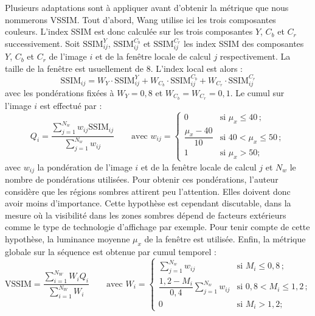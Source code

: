 Plusieurs adaptations sont à appliquer avant d'obtenir la métrique que nous nommerons VSSIM. Tout d'abord, Wang utilise ici les trois composantes couleurs. L'index SSIM est donc calculée sur les trois composantes $Y$, $C_b$ et $C_r$ successivement. Soit $\text{SSIM}_{\mathit{ij}}^Y$, $\text{SSIM}_{\mathit{ij}}^{C_b}$ et $\text{SSIM}_{\mathit{ij}}^{C_r}$ les index SSIM des composantes $Y$, $C_b$ et $C_r$ de l'image $i$ et de la fenêtre locale de calcul $j$ respectivement. La taille de la fenêtre est usuellement de 8. L'index local est alors :
\begin{equation}
\text{SSIM}_{\mathit{ij}} =W_Y \cdot \text{SSIM}_{\mathit{ij}}^Y + W_{C_b} \cdot \text{SSIM}_{\mathit{ij}}^{C_b} + W_{C_r} \cdot \text{SSIM}_{\mathit{ij}}^{C_r}
\end{equation}
%
avec les pondérations fixées à $W_Y=0,8$ et $W_{C_b}=W_{C_r}=0,1$. Le cumul sur l'image $i$ est effectué par :
\begin{equation}
Q_i = \dfrac{\sum\limits_{j=1}^{N_w} w_{\mathit{ij}} \text{SSIM}_{ij}}{\sum\limits_{j=1}^{N_w} w_{\mathit{ij}}} \qquad \text{avec } w_{\mathit{ij}} =
\begin{cases}
0 							&			\text{si } \mu_x \leqslant 40\, ; \\
\dfrac{\mu_x-40}{10} 		&			\text{si } 40 < \mu_x \leqslant 50\, ; \\
1							&			\text{si } \mu_x > 50 ;
\end{cases}
\end{equation}
%
avec $w_{\mathit{ij}}$ la pondération de l'image $i$ et de la fenêtre locale de calcul $j$ et $N_w$ le nombre de pondérations utilisées. Pour obtenir ces pondérations, l'auteur considère que les régions sombres attirent peu l'attention. Elles doivent donc avoir moins d'importance. Cette hypothèse est cependant discutable, dans la mesure où la visibilité dans les zones sombres dépend de facteurs extérieurs comme le type de technologie d'affichage par exemple. Pour tenir compte de cette hypothèse, la luminance moyenne $\mu_x$ de la fenêtre est utilisée. Enfin, la métrique globale sur la séquence est obtenue par cumul temporel :
\begin{equation}
\text{VSSIM} = \dfrac{\sum\limits_{i=1}^{N_W} W_i Q_i}{\sum\limits_{i=1}^{N_W} W_i} \qquad \text{avec }
W_i =
\begin{cases}
\sum\limits_{j=1}^{N_w} w_{\mathit{ij}} 									&			\text{si } M_i \leqslant 0,8\, ;\\
\dfrac{1,2-M_i}{0,4}\sum\limits_{j=1}^{N_w} w_{\mathit{ij}} 	&			\text{si } 0,8 < M_i \leqslant 1,2\, ;\\
0																									&			\text{si } M_i > 1,2 ;
\end{cases}
\end{equation}
